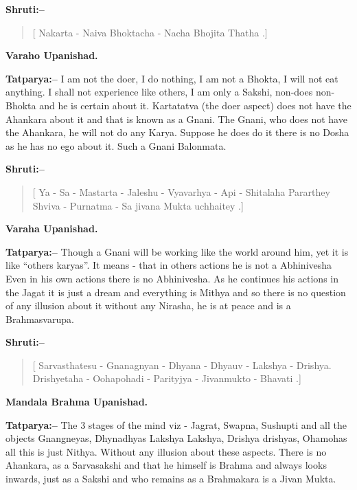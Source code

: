 \textbf{Shruti:–}

\begin{verse}
[ Nakarta - Naiva Bhoktacha - Nacha Bhojita Thatha .]
\end{verse}

\begin{flushright}
\textbf{Varaho Upanishad.}
\end{flushright}

\textbf{Tatparya:–} I am not the doer, I do nothing, I am not a Bhokta, I will not eat anything. I shall not experience like others, I am only a Sakshi, non-does non-Bhokta and he is certain about it. Kartatatva (the doer aspect) does not have the Ahankara about it and that is known as a Gnani. The Gnani, who does not have the Ahankara, he will not do any Karya. Suppose he does do it there is no Dosha as he has no ego about it. Such a Gnani Balonmata.

\newpage

\textbf{Shruti:–}

\begin{verse}
[ Ya - Sa - Mastarta - Jaleshu - Vyavarhya - Api - Shita\break laha  Pararthey Shviva - Purnatma - Sa jivana Mukta uchhaitey .]
\end{verse}

\begin{flushright}
\textbf{Varaha Upanishad.}
\end{flushright}

\textbf{Tatparya:–} Though a Gnani will be working like the world around him, yet it is like “others karyas”. It means - that in others actions he is not a Abhinivesha Even in his own actions there is no Abhinivesha. As he continues his actions in the Jagat it is just a dream and everything is Mithya and so there is no question of any illusion about it without any Nirasha, he is at peace and is a Brahmasvarupa.

\textbf{Shruti:–}

\begin{verse}
[ Sarvasthatesu - Gnanagnyan - Dhyana - Dhyauv - Lakshya - Drishya. Drishyetaha - Oohapohadi - Parityjya - Jivanmukto - Bhavati .]
\end{verse}

\begin{flushright}
\textbf{Mandala Brahma Upanishad.}
\end{flushright}

\textbf{Tatparya:–} The 3 stages of the mind viz - Jagrat, Swapna, Sushupti and all the objects Gnangneyas, Dhynadhyas Lakshya Lakshya, Drishya drishyas, Ohamohas all this is just Nithya. Without any illusion about these aspects. There is no Ahankara, as a Sarvasakshi and that he himself is Brahma and always looks inwards, just as a Sakshi and who remains as a Brahmakara is a Jivan Mukta.

